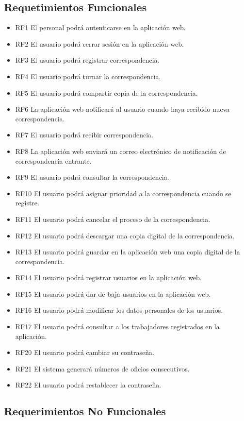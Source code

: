 \subsection{Requetimientos Funcionales}
\begin{itemize}
	\item RF1 El personal podrá autenticarse en la aplicación web.
	\item RF2 El usuario podrá cerrar sesión en la aplicación web.
	\item RF3 El usuario podrá registrar correspondencia. 
	\item RF4 El usuario podrá turnar la correspondencia. 
	\item RF5 El usuario podrá compartir copia de la correspondencia. 
	\item RF6 La aplicación web notificará al usuario cuando haya recibido nueva correspondencia.
	\item RF7 El usuario podrá recibir correspondencia.
	\item RF8 La aplicación web enviará un correo electrónico de notificación de correspondencia entrante.
	\item RF9 El usuario podrá consultar la correspondencia. 
	\item RF10 El usuario podrá asignar prioridad a la correspondencia cuando se registre.
	\item RF11 El usuario podrá cancelar el proceso de la correspondencia. 
	\item RF12 El usuario podrá descargar una copia digital de la correspondencia. 
	\item RF13 El usuario podrá guardar en la aplicación web una copia digital de la correspondencia.
	\item RF14 El usuario podrá registrar usuarios en la aplicación web. 
	\item RF15 El usuario podrá dar de baja usuarios en la aplicación web. 
	\item RF16 El usuario podrá modificar los datos personales de los usuarios.
	\item RF17 El usuario podrá consultar a los trabajadores registrados en la aplicación.
	\item RF20 El usuario podrá cambiar su contraseña. 
	\item RF21 El sistema generará números de oficios consecutivos. 
	\item RF22 El usuario podrá restablecer la contraseña.
\end{itemize}
 

\subsection{Requerimientos No Funcionales}

